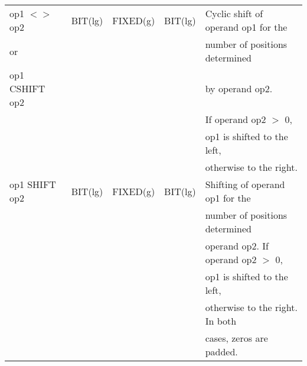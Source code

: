 \begin{table}
\begin{center}
\begin{tabular}{|l|l|l|l|l|}
op1 $<>$ op2     & BIT(lg)         & FIXED(g)        & BIT(lg)           & Cyclic shift of operand op1 for the\\
or               &                 &                 &                   & number of positions determined\\
op1 CSHIFT op2
\index{CSHIFT@\textbf{CSHIFT}|textbf}
   &                 &                 &                   & by operand op2.\\
                 &                 &                 &                   & If operand op2 $>$ 0,\\
                 &                 &                 &                   & op1 is shifted to the left,\\
                 &                 &                 &                   & otherwise to the right.\\ \hline

op1 SHIFT op2
\index{SHIFT@\textbf{SHIFT}|textbf}
    & BIT(lg)         & FIXED(g)        & BIT(lg)           & Shifting of operand op1 for the\\
                 &                 &                 &                   & number of positions determined\\
                 &                 &                 &                   & operand op2. If operand op2 $>$ 0,\\
                 &                 &                 &                   & op1 is shifted to the left,\\
                 &                 &                 &                   & otherwise to the right. In both\\
                 &                 &                 &                   & cases, zeros are padded.\\ 
\hline
\end{tabular}
\end{center}
\end{table}

